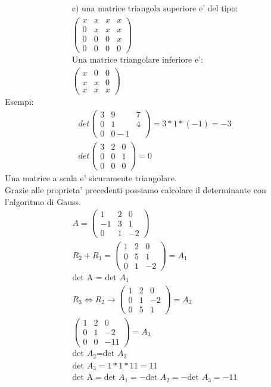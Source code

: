 \documentclass[a4paper,12pt]{article}
\begin{document}
\begin{align*}
    \text{c) una matrice triangola superiore e' del tipo:}
    \\ \begin{pmatrix}
        x & x & x & x \\
        0 & x & x & x \\
        0 & 0 & 0 & x \\
        0 & 0 & 0 & 0
    \end{pmatrix}
    \\\text{Una matrice triangolare inferiore e':}
    \\\begin{pmatrix}
        x & 0 & 0 \\
        x & x & 0 \\
        x & x & x
    \end{pmatrix}
\end{align*}
Esempi:
\begin{align}
    det\begin{pmatrix}
        3 & 9 & 7 \\
        0 & 1 & 4 \\
        0 & 0 -1
    \end{pmatrix}=3*1*(-1)=-3
    \\ det\begin{pmatrix}
        3 & 2 & 0 \\
        0 & 0 & 1 \\
        0 & 0 & 0
    \end{pmatrix}=0
\end{align}
Una matrice a scala e' sicuramente triangolare. \\
\pagebreak
Grazie alle proprieta' precedenti possiamo calcolare il determinante con l'algoritmo di Gauss.
\begin{align*}
    A=\begin{pmatrix}
        1 & 2 & 0 \\-1&3&1\\0&1&-2
    \end{pmatrix}
    \\R_2+R_1=\begin{pmatrix}
        1&2&0\\0&5&1\\0&1&-2
    \end{pmatrix}=A_1 \\
    \text{det A = det }A_1
    \\ R_3 \iff R_2 \to \begin{pmatrix}
        1&2&0\\0&1&-2\\0&5&1
    \end{pmatrix}=A_2
    \\\begin{pmatrix}
        1&2&0\\0&1&-2\\0&0&-11
    \end{pmatrix}=A_3 \\
    \text{det }A_2 \text{=det }A_3
    \\\text{det }A_3=1*1*11=11
    \\\text{det A}=\text{det }A_1=-\text{det }A_2=-\text{det }A_3=-11 \\
\end{align*}
\end{document}
